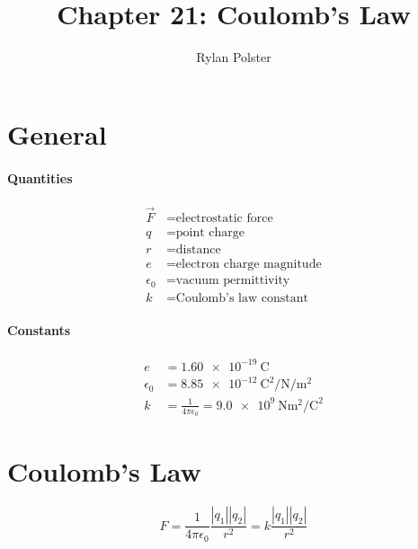 \documentclass{article}
\title{Chapter 21: Coulomb's Law}
\author{Rylan Polster}
\begin{document}
    \maketitle
    
    \section*{General}

        \paragraph{Quantities}
        \begin{align}
            \vec{F} &= \text{electrostatic force} \nonumber\\
            q &= \text{point charge} \nonumber\\
            r &= \text{distance} \nonumber\\
            e &= \text{electron charge magnitude} \nonumber\\
            \epsilon_0 &= \text{vacuum permittivity} \nonumber\\
            k &= \text{Coulomb's law constant} \nonumber
        \end{align}

        \paragraph{Constants}
        \begin{align}
            e &= \SI{1.60e-19}{\coulomb} \nonumber\\
            \epsilon_0 &= \SI[per-mode=fraction]{8.85e-12}{\coulomb\squared\per\newton\per\meter\squared} \nonumber\\
            k &= \frac{1}{4 \pi \epsilon_0} = \SI[per-mode=fraction]{9.0e9}{\newton\meter\squared\per\square\coulomb} \nonumber
        \end{align}

    \section{Coulomb's Law}

        \begin{equation}
            F = \frac{1}{4\pi\epsilon_0} \frac{\left|q_1\right|\left|q_2\right|}{r^2} = k \frac{\left|q_1\right|\left|q_2\right|}{r^2}
        \end{equation}
\end{document}
